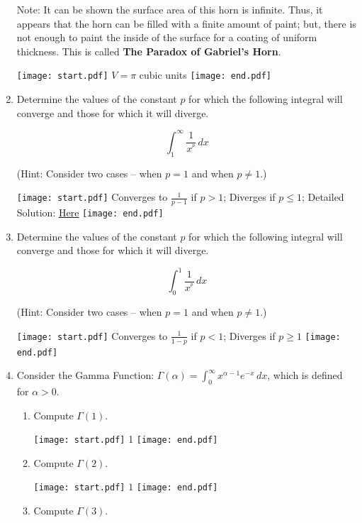 \documentclass[12pt]{article}
\begin{document}
\begin{enumerate}
\bigskip

Note: It can be shown the surface area of this horn is infinite.  Thus, it appears that the horn can be filled with a finite amount of paint; but, there is not enough to paint the inside of the surface for a coating of uniform thickness.  This is called {\bf The Paradox of Gabriel's Horn}.

\texttt{[image: start.pdf]}
{{$V=\pi$ cubic units}}
\texttt{[image: end.pdf]}


\item Determine the values of the constant $p$ for which the following integral will converge and those for which it will diverge.  

$$\int_1^\infty \frac{1}{x^{^p}} \,dx$$

(Hint: Consider two cases -- when $p=1$ and when $p \neq 1$.)

\texttt{[image: start.pdf]}
{{Converges to $\frac{1}{p-1}$ if $p>1$; Diverges if $p \leq 1$; Detailed Solution: \textcolor{blue}{\href{http://www.math.drexel.edu/classes/Calculus/resources/Math122HW/Solutions/122_13_Improper_17.pdf}{Here}}}}
\texttt{[image: end.pdf]}


\newpage

\item Determine the values of the constant $p$ for which the following integral will converge and those for which it will diverge.  

$$\int_0^1 \frac{1}{x^{^p}} \,dx$$

(Hint: Consider two cases -- when $p=1$ and when $p \neq 1$.)

\texttt{[image: start.pdf]}
{{Converges to $\frac{1}{1-p}$ if $p<1$; Diverges if $p \geq 1$}}
\texttt{[image: end.pdf]}


\item Consider the Gamma Function: $\Gamma(\alpha)=\int_0^{\infty} x^{\alpha-1}e^{-x} \,dx$, which is defined for $\alpha>0$.

\begin{enumerate}

\item Compute $\Gamma(1)$.

\texttt{[image: start.pdf]}
{{1}}
\texttt{[image: end.pdf]}


\item Compute $\Gamma(2)$.

\texttt{[image: start.pdf]}
{{$1$}}
\texttt{[image: end.pdf]}


\item Compute $\Gamma(3)$.


\end{enumerate}
\end{enumerate}
\end{document}

